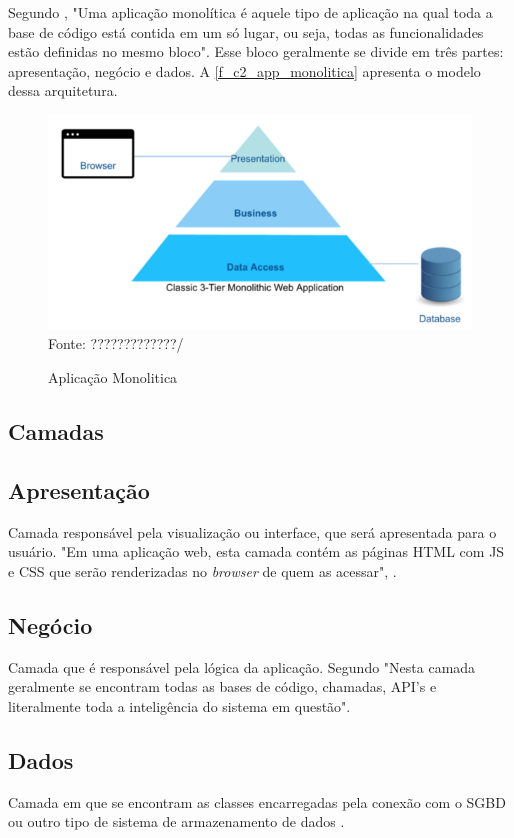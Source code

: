 Segundo \cite{monoVsMicro2017},  "Uma aplicação monolítica é aquele tipo de aplicação na qual toda a base de código está contida em um só lugar, ou seja, todas as funcionalidades estão definidas no mesmo bloco". Esse bloco geralmente se divide em três partes: apresentação, negócio e dados. A \autoref{f_c2_app_monolitica} apresenta o modelo dessa arquitetura.

\begin{figure}[h]
	\centering
	\caption{Aplicação Monolitica}
	\includegraphics[scale=0.7]{images/app-monolitica.png}\\
	Fonte: ?????????????/
 	\label{f_c2_app_monolitica}
\end{figure}

\newpage
\subsection*{Camadas}

\subsection*{Apresentação}
Camada responsável pela visualização ou interface, que será apresentada para o usuário. "Em uma aplicação web, esta camada contém as páginas \ac{HTML} com \ac{JS} e \ac{CSS} que serão renderizadas no \textit{browser} de quem as acessar",  \cite{monoVsMicro2017}.

\subsection*{Negócio}
Camada que é responsável pela lógica da aplicação. Segundo \cite{monoVsMicro2017} "Nesta camada geralmente se encontram todas as bases de código, chamadas, \ac{API}'s e literalmente toda a inteligência do sistema em questão".

\subsection*{Dados}
Camada em que se encontram as classes encarregadas pela conexão com o \ac{SGBD} ou outro tipo de sistema de armazenamento de dados \cite{monoVsMicro2017}.

